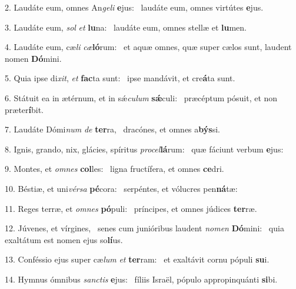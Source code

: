 2. Laudáte eum, omnes An\textit{ge}\textit{li} \textbf{e}jus: \ast\  laudáte eum, omnes virtútes \textbf{e}jus.\

3. Laudáte eum, \textit{sol} \textit{et} \textbf{lu}na: \ast\  laudáte eum, omnes stellæ et \textbf{lu}men.\

4. Laudáte eum, cæ\textit{li} \textit{cæ}\textbf{ló}rum: \ast\  et aquæ omnes, quæ super cælos sunt, laudent nomen \textbf{Dó}mini.\

5. Quia ipse di\textit{xit}, \textit{et} \textbf{fac}ta sunt: \ast\  ipse mandávit, et cre\textbf{á}ta sunt.\

6. Státuit ea in ætérnum, et in sǽ\textit{cu}\textit{lum} \textbf{sǽ}culi: \ast\  præcéptum pósuit, et non præter\textbf{í}bit.\

7. Laudáte Dómi\textit{num} \textit{de} \textbf{ter}ra, \ast\  dracónes, et omnes a\textbf{býs}si.\

8. Ignis, grando, nix, glácies, spíritus \textit{pro}\textit{cel}\textbf{lá}rum: \ast\  quæ fáciunt verbum \textbf{e}jus:\

9. Montes, et \textit{om}\textit{nes} \textbf{col}les: \ast\  ligna fructífera, et omnes \textbf{ce}dri.\

10. Béstiæ, et uni\textit{vér}\textit{sa} \textbf{pé}cora: \ast\  serpéntes, et vólucres pen\textbf{ná}tæ:\

11. Reges terræ, et \textit{om}\textit{nes} \textbf{pó}puli: \ast\  príncipes, et omnes júdices \textbf{ter}ræ.\

12. Júvenes, et vírgines, \dag\  senes cum junióribus laudent \textit{no}\textit{men} \textbf{Dó}mini: \ast\  quia exaltátum est nomen ejus so\textbf{lí}us.\

13. Conféssio ejus super cæ\textit{lum} \textit{et} \textbf{ter}ram: \ast\  et exaltávit cornu pópuli \textbf{su}i.\

14. Hymnus ómnibus \textit{sanc}\textit{tis} \textbf{e}jus: \ast\  fíliis Israël, pópulo appropinquánti \textbf{si}bi.\

